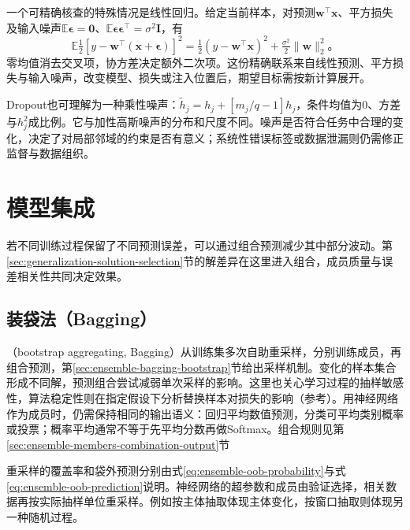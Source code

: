 一个可精确核查的特殊情况是线性回归。给定当前样本，对预测$\bm w^{\top}\bm x$、平方损失及输入噪声$\mathbb E\bm\epsilon=\bm0$、$\mathbb E\bm\epsilon\bm\epsilon^{\top}=\sigma^2\bm I$，有
\begin{equation}
  \mathbb E\tfrac12[y-\bm w^{\top}(\bm x+\bm\epsilon)]^2
  =\tfrac12(y-\bm w^{\top}\bm x)^2+\tfrac{\sigma^2}{2}\lVert\bm w\rVert_2^2\text{。}
  \label{eq:generalization-linear-noise}
\end{equation}
零均值消去交叉项，协方差决定额外二次项。这份精确联系来自线性预测、平方损失与输入噪声，改变模型、损失或注入位置后，期望目标需按新计算展开。

Dropout也可理解为一种乘性噪声：$\tilde h_j=h_j+[m_j/q-1]h_j$，条件均值为0、方差与$h_j^2$成比例。它与加性高斯噪声的分布和尺度不同。噪声是否符合任务中合理的变化，决定了对局部邻域的约束是否有意义；系统性错误标签或数据泄漏则仍需修正监督与数据组织。

\section{模型集成}
\label{sec:generalization-ensembles}

若不同训练过程保留了不同预测误差，可以通过组合预测减少其中部分波动。第\ref{sec:generalization-solution-selection}节的解差异在这里进入组合，成员质量与误差相关性共同决定效果。

\subsection{装袋法（Bagging）}
\label{sec:generalization-bagging}

（bootstrap aggregating, Bagging）从训练集多次自助重采样，分别训练成员，再组合预测，第\ref{sec:ensemble-bagging-bootstrap}节给出采样机制。变化的样本集合形成不同解，预测组合尝试减弱单次采样的影响。这里也关心学习过程的抽样敏感性，算法稳定性则在指定假设下分析替换样本对损失的影响（参考）。用神经网络作为成员时，仍需保持相同的输出语义：回归平均数值预测，分类可平均类别概率或投票；概率平均通常不等于先平均分数再做Softmax。组合规则见第\ref{sec:ensemble-members-combination-output}节

重采样的覆盖率和袋外预测分别由式\eqref{eq:ensemble-oob-probability}与式\eqref{eq:ensemble-oob-prediction}说明。神经网络的超参数和成员由验证选择，相关数据再按实际抽样单位重采样。例如按主体抽取体现主体变化，按窗口抽取则体现另一种随机过程。

